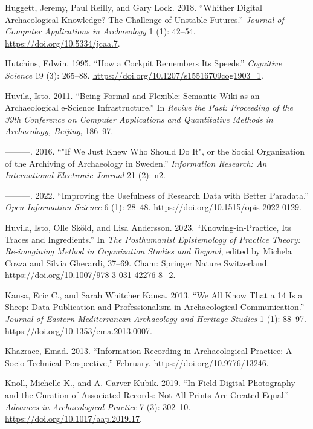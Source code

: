 \documentclass[
]{article}
\newlength{\cslhangindent}
\newenvironment{CSLReferences}[2] %
 {\begin{list}{}{%
  \setlength{\itemindent}{0pt}
  \setlength{\leftmargin}{0pt}
  \setlength{\parsep}{0pt}
  \ifodd #1
   \setlength{\leftmargin}{\cslhangindent}
   \setlength{\itemindent}{-1\cslhangindent}
  \fi
  \setlength{\itemsep}{#2\baselineskip}}}
 {\end{list}}
\begin{document}
\begin{CSLReferences}{1}{0}
Huggett, Jeremy, Paul Reilly, and Gary Lock. 2018. {``Whither {Digital
Archaeological Knowledge}? {The Challenge} of {Unstable Futures}.''}
\emph{Journal of Computer Applications in Archaeology} 1 (1): 42--54.
\url{https://doi.org/10.5334/jcaa.7}.

Hutchins, Edwin. 1995. {``How a {Cockpit Remembers Its Speeds}.''}
\emph{Cognitive Science} 19 (3): 265--88.
\url{https://doi.org/10.1207/s15516709cog1903_1}.

Huvila, Isto. 2011. {``Being Formal and Flexible: Semantic Wiki as an
Archaeological e-Science Infrastructure.''} In \emph{Revive the {Past}:
{Proceeding} of the 39th {Conference} on {Computer Applications} and
{Quantitative Methods} in {Archaeology}, {Beijing}}, 186--97.

---------. 2016. {``"{If We Just Knew Who Should Do It}", or the {Social
Organization} of the {Archiving} of {Archaeology} in {Sweden}.''}
\emph{Information Research: An International Electronic Journal} 21 (2):
n2.

---------. 2022. {``Improving the Usefulness of Research Data with
Better Paradata.''} \emph{Open Information Science} 6 (1): 28--48.
\url{https://doi.org/10.1515/opis-2022-0129}.

Huvila, Isto, Olle Sköld, and Lisa Andersson. 2023.
{``Knowing-in-{Practice}, {Its Traces} and {Ingredients}.''} In
\emph{The {Posthumanist Epistemology} of {Practice Theory}:
{Re-imagining Method} in {Organization Studies} and {Beyond}}, edited by
Michela Cozza and Silvia Gherardi, 37--69. Cham: Springer Nature
Switzerland. \url{https://doi.org/10.1007/978-3-031-42276-8_2}.

Kansa, Eric C., and Sarah Whitcher Kansa. 2013. {``We {All Know That} a
14 {Is} a {Sheep}: {Data Publication} and {Professionalism} in
{Archaeological Communication}.''} \emph{Journal of Eastern
Mediterranean Archaeology and Heritage Studies} 1 (1): 88--97.
\url{https://doi.org/10.1353/ema.2013.0007}.

Khazraee, Emad. 2013. {``Information Recording in Archaeological
Practice: {A} Socio-Technical Perspective,''} February.
\url{https://doi.org/10.9776/13246}.

Knoll, Michelle K., and A. Carver-Kubik. 2019. {``In-{Field Digital
Photography} and the {Curation} of {Associated Records}: {Not All Prints
Are Created Equal}.''} \emph{Advances in Archaeological Practice} 7 (3):
302--10. \url{https://doi.org/10.1017/aap.2019.17}.


\end{CSLReferences}
\end{document}
